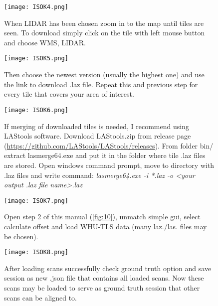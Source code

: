 \begin{figure}[H]
	\centering
	\texttt{[image: ISOK4.png]}
	\caption{When LIDAR has been chosen zoom in to the map until tiles are seen. To download simply click on the tile with left mouse button and choose WMS, LIDAR.}
	\label{fig:37}
\end{figure}

\begin{figure}[H]
	\centering
	\texttt{[image: ISOK5.png]}
	\caption{Then choose the newest version (usually the highest one) and use the link to download .laz file. Repeat this and previous step for every tile that covers your area of interest.}
	\label{fig:38}
\end{figure}

\begin{figure}[H]
	\centering
	\texttt{[image: ISOK6.png]}
	\caption{If merging of downloaded tiles is needed, I recommend using LAStools software. Download LAStools.zip from release page (\url{https://github.com/LAStools/LAStools/releases}). From folder bin/ extract lasmerge64.exe and put it in the folder where tile .laz files are stored. Open windows command prompt, move to directory with .laz files and write command: 
		\textit{lasmerge64.exe -i *.laz -o <your output .laz file name>.laz}}
	\label{fig:39}
\end{figure}

\begin{figure}[H]
	\centering
	\texttt{[image: ISOK7.png]}
	\caption{Open step 2 of this manual (\ref{fig:10}), unmatch simple gui, select calculate offset and load WHU-TLS data (many laz./las. files may be chosen).}
	\label{fig:40}
\end{figure}

\begin{figure}[H]
	\centering
	\texttt{[image: ISOK8.png]}
	\caption{After loading scans successfully check ground truth option and save session as new .json file that contains all loaded scans. Now these scans may be loaded to serve as ground truth session that other scans can be aligned to.}
	\label{fig:41}
\end{figure}